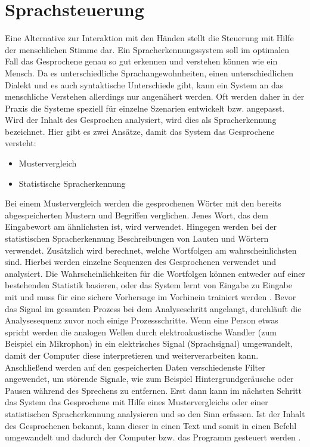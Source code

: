 \section{Sprachsteuerung}
Eine Alternative zur Interaktion mit den Händen stellt die Steuerung mit Hilfe der menschlichen Stimme dar. Ein Spracherkennungssystem soll im optimalen Fall das \mbox{Gesprochene} genau so gut erkennen und verstehen können wie ein Mensch. Da es unterschiedliche Sprachangewohnheiten, einen unterschiedlichen Dialekt und es auch \mbox{syntaktische} Unterschiede gibt, kann ein System an das menschliche Verstehen \mbox{allerdings} nur angenähert werden. Oft werden daher in der Praxis die Systeme speziell für einzelne Szenarien entwickelt bzw. angepasst. 
\newline \newline
Wird der Inhalt des Gesprochen analysiert, wird dies als Spracherkennung bezeichnet. Hier gibt es zwei Ansätze, damit das System das Gesprochene versteht:
\begin{itemize}
      \item Mustervergleich
      \item Statistische Spracherkennung
\end{itemize}
\vspace{\baselineskip}
Bei einem Mustervergleich werden die gesprochenen Wörter mit den bereits abgespeicherten Mustern und Begriffen verglichen. Jenes Wort, das dem Eingabewort am ähnlichsten ist, wird verwendet. Hingegen werden bei der statistischen Spracherkennung Beschreibungen von Lauten und Wörtern verwendet. Zusätzlich wird berechnet, welche Wortfolgen am wahrscheinlichsten sind. Hierbei werden einzelne Sequenzen des Gesprochenen verwendet und analysiert. Die Wahrscheinlichkeiten für die Wortfolgen können entweder auf einer bestehenden Statistik basieren, oder das System lernt von Eingabe zu Eingabe mit und muss für eine sichere Vorhersage im Vorhinein trainiert werden \cite{KaufmannPfisterSprache}. 
\newline \newline
Bevor das Signal im gesamten Prozess bei dem Analyseschritt angelangt, durchläuft die Analysesequenz zuvor noch einige Prozessschritte. Wenn eine Person etwas spricht werden die analogen Wellen durch elektroakustische Wandler (zum Beispiel ein Mikrophon) in ein elektrisches Signal (Sprachsignal) umgewandelt, damit der Computer diese interpretieren und weiterverarbeiten kann. Anschließend werden auf den gespeicherten Daten verschiedenste Filter angewendet, um störende Signale, wie zum Beispiel \mbox{Hintergrundgeräusche} oder Pausen während des Sprechens zu entfernen. Erst dann kann im nächsten Schritt das System das Gesprochene mit Hilfe eines Mustervergleichs oder einer statistischen Spracherkennung analysieren und so den Sinn erfassen. Ist der Inhalt des Gesprochenen bekannt, kann dieser in einen Text und somit in einen Befehl umgewandelt und dadurch der Computer bzw. das Programm gesteuert werden \cite{KaufmannPfisterSprache}.
